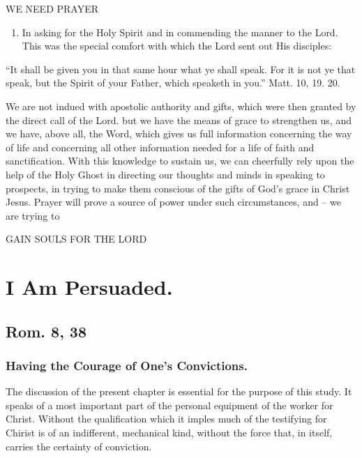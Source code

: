 \documentclass[
]{book}
\providecommand{\tightlist}{%
  \setlength{\itemsep}{0pt}\setlength{\parskip}{0pt}}
\begin{document}
WE NEED PRAYER

\begin{enumerate}
\def\labelenumi{\alph{enumi}.}
\setcounter{enumi}{4}
\tightlist
\item
  In asking for the Holy Spirit and in commending the manner to the Lord. This was the special comfort with which the Lord sent out His disciples:
\end{enumerate}

``It shall be given you in that same hour what ye shall speak. For it is not ye that speak, but the Spirit of your Father, which speaketh in you.'' Matt. 10, 19. 20.

We are not indued with apostolic authority and gifts, which were then granted by the direct call of the Lord. but we have the means of grace to strengthen us, and we have, above all, the Word, which gives us full information concerning the way of life and concerning all other information needed for a life of faith and sanctification. With this knowledge to sustain us, we can cheerfully rely upon the help of the Holy Ghost in directing our thoughts and minds in speaking to prospects, in trying to make them conscious of the gifts of God's grace in Christ Jesus. Prayer will prove a source of power under such circumstances, and -- we are trying to

\begin{center} GAIN SOULS FOR THE LORD \end{center}

\hypertarget{i-am-persuaded.}{%
\chapter{I Am Persuaded.}\label{i-am-persuaded.}}

\hypertarget{rom.-8-38}{%
\section*{Rom. 8, 38}\label{rom.-8-38}}

\hypertarget{having-the-courage-of-ones-convictions.}{%
\subsection*{Having the Courage of One's Convictions.}\label{having-the-courage-of-ones-convictions.}}

The discussion of the present chapter is essential for the purpose of this study. It speaks of a most important part of the personal equipment of the worker for Christ. Without the qualification which it imples much of the testifying for Chirist is of an indifferent, mechanical kind, without the force that, in itself, carries the certainty of conviction.
\end{document}
